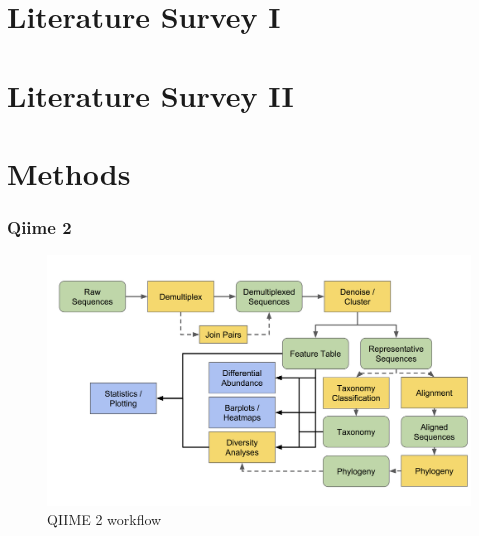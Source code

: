 \documentclass{beamer}
\begin{document}
    \section{Literature Survey I \protect \cite{validate1}}

    \section{Literature Survey II \protect \cite{validate2}}

    \section{Methods}
    \begin{frame}
        \frametitle{Qiime 2}

        \begin{figure}[h!]
            \includegraphics[width=0.8 \linewidth]{figures/qiime.png}
            \caption{QIIME 2 workflow \protect \cite{qiime1, qiime2, qiime3}}
        \end{figure}
    \end{frame}
\end{document}
